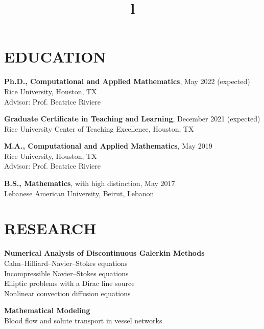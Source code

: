 \documentclass[margin]{res}
\begin{document}
\begin{resume}

\section{EDUCATION}
\textbf{Ph.D., Computational and Applied Mathematics}, May 2022 (expected)\\
Rice University, Houston, TX \\ 
Advisor: Prof. Beatrice Riviere 
\par \textbf{Graduate Certificate in Teaching and Learning}, December 2021 (expected)\\
Rice University Center of Teaching Excellence, Houston, TX 
\par
\textbf{M.A., Computational and Applied Mathematics}, May 2019 \\
Rice University, Houston, TX \\ 
Advisor:  Prof. Beatrice Riviere 
\par
\textbf{B.S., Mathematics}, with high distinction, May 2017\\
Lebanese American University, Beirut, Lebanon 
\section{RESEARCH}
\par
\textbf{Numerical Analysis of Discontinuous Galerkin Methods} \\
Cahn–Hilliard–Navier–Stokes equations \\ 
 Incompressible Navier--Stokes equations   \\ 
 Elliptic problems with a Dirac line source \\ 
Nonlinear convection diffusion equations 

\par 
\textbf{Mathematical Modeling} \\
 Blood flow and solute transport in vessel networks
 
\begin{format}
\title{l}\\
\\
\body\\
\end{format}


\end{resume}
\end{document}
